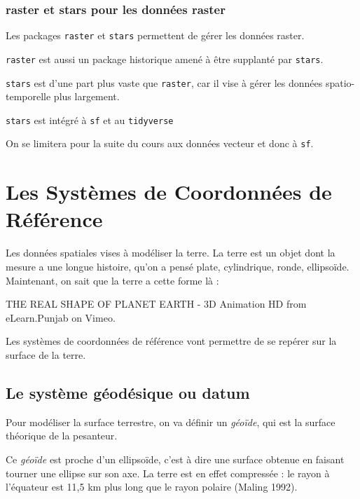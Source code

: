 \documentclass[
]{book}
\begin{document}
\hypertarget{raster-et-stars-pour-les-donnuxe9es-raster}{%
\subsection{raster et stars pour les données raster}\label{raster-et-stars-pour-les-donnuxe9es-raster}}

Les packages \texttt{raster} et \texttt{stars} permettent de gérer les données raster.

\texttt{raster} est aussi un package historique amené à être supplanté par \texttt{stars}.

\texttt{stars} est d'une part plus vaste que \texttt{raster}, car il vise à gérer les données spatio-temporelle plus largement.

\texttt{stars} est intégré à \texttt{sf} et au \texttt{tidyverse}

On se limitera pour la suite du cours aux données vecteur et donc à \texttt{sf}.

\hypertarget{les-systuxe8mes-de-coordonnuxe9es-de-ruxe9fuxe9rence}{%
\chapter{Les Systèmes de Coordonnées de Référence}\label{les-systuxe8mes-de-coordonnuxe9es-de-ruxe9fuxe9rence}}

Les données spatiales vises à modéliser la terre.
La terre est un objet dont la mesure a une longue histoire, qu'on a pensé plate, cylindrique, ronde, ellipsoïde. Maintenant, on sait que la terre a cette forme là :

THE REAL SHAPE OF PLANET EARTH - 3D Animation HD from eLearn.Punjab on Vimeo.

Les systèmes de coordonnées de référence vont permettre de se repérer sur la surface de la terre.

\hypertarget{le-systuxe8me-guxe9oduxe9sique-ou-datum}{%
\section{Le système géodésique ou datum}\label{le-systuxe8me-guxe9oduxe9sique-ou-datum}}

Pour modéliser la surface terrestre, on va définir un \emph{géoïde}, qui est la surface théorique de la pesanteur.

Ce \emph{géoïde} est proche d'un ellipsoïde, c'est à dire une surface obtenue en faisant tourner une ellipse sur son axe. La terre est en effet compressée : le rayon à l'équateur est 11,5 km plus long que le rayon polaire (Maling 1992).
\end{document}
